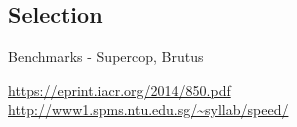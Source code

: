 \subsection{Selection}

Benchmarks - Supercop, Brutus

\url{https://eprint.iacr.org/2014/850.pdf}
\url{http://www1.spms.ntu.edu.sg/~syllab/speed/}
